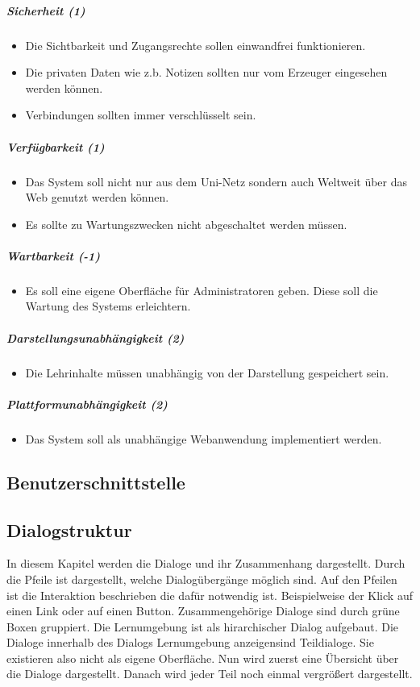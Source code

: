 \documentclass[12pt,a4paper]{article}
\begin{document}
{\subparagraph{Sicherheit (1)}
\begin{itemize}
\item Die Sichtbarkeit und Zugangsrechte sollen einwandfrei funktionieren.
\item Die privaten Daten wie z.b. Notizen sollten nur vom Erzeuger eingesehen werden können.
\item Verbindungen sollten immer verschlüsselt sein.
\end{itemize}
\subparagraph{Verfügbarkeit (1)}
\begin{itemize}
\item Das System soll nicht nur aus dem Uni-Netz sondern auch Weltweit über das Web genutzt werden können.
\item Es sollte zu Wartungszwecken nicht abgeschaltet werden müssen.
\end{itemize}
\subparagraph{Wartbarkeit (-1)}
\begin{itemize}
\item Es soll eine eigene Oberfläche für Administratoren geben. Diese soll  die Wartung des Systems erleichtern.
\end{itemize}
\subparagraph{Darstellungsunabhängigkeit (2)}
\begin{itemize}
\item Die Lehrinhalte müssen unabhängig von der Darstellung gespeichert sein.
\end{itemize}
\subparagraph{Plattformunabhängigkeit (2)}
\begin{itemize}
\item Das System soll als unabhängige Webanwendung implementiert werden.
\end{itemize}


\begin{landscape}
\section{Benutzerschnittstelle}
\subsection{Dialogstruktur}
In diesem Kapitel werden die Dialoge und ihr Zusammenhang dargestellt. Durch die Pfeile ist dargestellt, welche Dialogübergänge möglich sind. Auf den Pfeilen ist die Interaktion beschrieben die dafür notwendig ist. Beispielweise der Klick auf einen Link oder auf einen Button. Zusammengehörige Dialoge sind durch grüne Boxen gruppiert. Die Lernumgebung ist als hirarchischer Dialog aufgebaut. Die Dialoge innerhalb des Dialogs \glqq Lernumgebung anzeigen\grqq sind Teildialoge. Sie existieren also nicht als eigene Oberfläche. Nun wird zuerst eine Übersicht über die Dialoge dargestellt. Danach wird jeder Teil noch einmal vergrößert dargestellt.


\end{landscape}}
\end{document}
